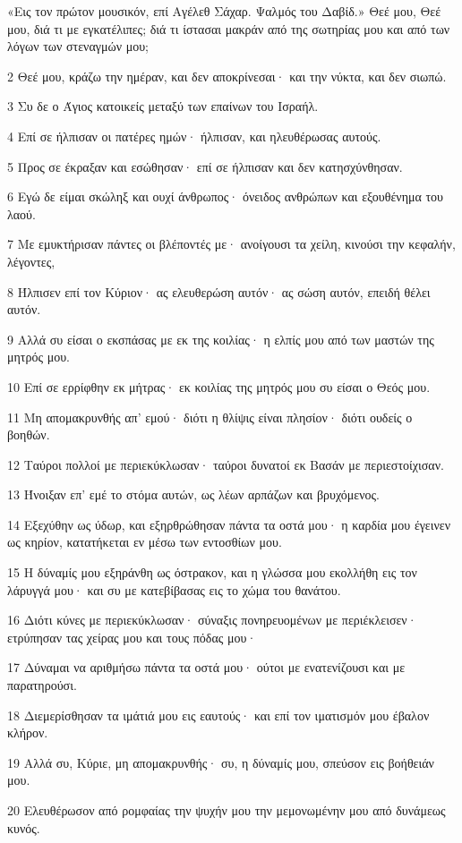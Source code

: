 \par «Εις τον πρώτον μουσικόν, επί Αγέλεθ Σάχαρ. Ψαλμός του Δαβίδ.» Θεέ μου, Θεέ μου, διά τι με εγκατέλιπες; διά τι ίστασαι μακράν από της σωτηρίας μου και από των λόγων των στεναγμών μου;
\par 2 Θεέ μου, κράζω την ημέραν, και δεν αποκρίνεσαι· και την νύκτα, και δεν σιωπώ.
\par 3 Συ δε ο Άγιος κατοικείς μεταξύ των επαίνων του Ισραήλ.
\par 4 Επί σε ήλπισαν οι πατέρες ημών· ήλπισαν, και ηλευθέρωσας αυτούς.
\par 5 Προς σε έκραξαν και εσώθησαν· επί σε ήλπισαν και δεν κατησχύνθησαν.
\par 6 Εγώ δε είμαι σκώληξ και ουχί άνθρωπος· όνειδος ανθρώπων και εξουθένημα του λαού.
\par 7 Με εμυκτήρισαν πάντες οι βλέποντές με· ανοίγουσι τα χείλη, κινούσι την κεφαλήν, λέγοντες,
\par 8 Ήλπισεν επί τον Κύριον· ας ελευθερώση αυτόν· ας σώση αυτόν, επειδή θέλει αυτόν.
\par 9 Αλλά συ είσαι ο εκσπάσας με εκ της κοιλίας· η ελπίς μου από των μαστών της μητρός μου.
\par 10 Επί σε ερρίφθην εκ μήτρας· εκ κοιλίας της μητρός μου συ είσαι ο Θεός μου.
\par 11 Μη απομακρυνθής απ' εμού· διότι η θλίψις είναι πλησίον· διότι ουδείς ο βοηθών.
\par 12 Ταύροι πολλοί με περιεκύκλωσαν· ταύροι δυνατοί εκ Βασάν με περιεστοίχισαν.
\par 13 Ήνοιξαν επ' εμέ το στόμα αυτών, ως λέων αρπάζων και βρυχόμενος.
\par 14 Εξεχύθην ως ύδωρ, και εξηρθρώθησαν πάντα τα οστά μου· η καρδία μου έγεινεν ως κηρίον, κατατήκεται εν μέσω των εντοσθίων μου.
\par 15 Η δύναμίς μου εξηράνθη ως όστρακον, και η γλώσσα μου εκολλήθη εις τον λάρυγγά μου· και συ με κατεβίβασας εις το χώμα του θανάτου.
\par 16 Διότι κύνες με περιεκύκλωσαν· σύναξις πονηρευομένων με περιέκλεισεν· ετρύπησαν τας χείρας μου και τους πόδας μου·
\par 17 Δύναμαι να αριθμήσω πάντα τα οστά μου· ούτοι με ενατενίζουσι και με παρατηρούσι.
\par 18 Διεμερίσθησαν τα ιμάτιά μου εις εαυτούς· και επί τον ιματισμόν μου έβαλον κλήρον.
\par 19 Αλλά συ, Κύριε, μη απομακρυνθής· συ, η δύναμίς μου, σπεύσον εις βοήθειάν μου.
\par 20 Ελευθέρωσον από ρομφαίας την ψυχήν μου την μεμονωμένην μου από δυνάμεως κυνός.
